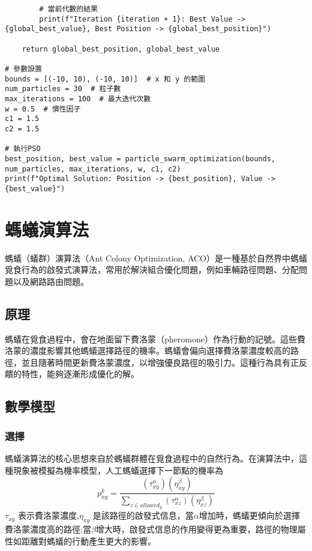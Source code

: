 \begin{verbatim}
        # 當前代數的結果
        print(f"Iteration {iteration + 1}: Best Value -> {global_best_value}, Best Position -> {global_best_position}")

    return global_best_position, global_best_value

# 參數設置
bounds = [(-10, 10), (-10, 10)]  # x 和 y 的範圍
num_particles = 30  # 粒子數
max_iterations = 100  # 最大迭代次數
w = 0.5  # 慣性因子
c1 = 1.5  
c2 = 1.5  

# 執行PSO
best_position, best_value = particle_swarm_optimization(bounds, num_particles, max_iterations, w, c1, c2)
print(f"Optimal Solution: Position -> {best_position}, Value -> {best_value}")
\end{verbatim}

\section{螞蟻演算法}
螞蟻（蟻群）演算法（Ant Colony Optimization, ACO）是一種基於自然界中螞蟻覓食行為的啟發式演算法，常用於解決組合優化問題，例如車輛路徑問題、分配問題以及網路路由問題。

\subsection{原理}
螞蟻在覓食過程中，會在地面留下費洛蒙（pheromone）作為行動的記號。這些費洛蒙的濃度影響其他螞蟻選擇路徑的機率。螞蟻會偏向選擇費洛蒙濃度較高的路徑，並且隨著時間更新費洛蒙濃度，以增強優良路徑的吸引力。這種行為具有正反饋的特性，能夠逐漸形成優化的解。
\subsection{數學模型}
\subsubsection{選擇}
螞蟻演算法的核心思想來自於螞蟻群體在覓食過程中的自然行為。在演算法中，這種現象被模擬為機率模型，人工螞蟻選擇下一節點的機率為
\begin{equation} \label{eq:ACO_probability}
    p^{k}_{xy} = \frac{(\tau^{\alpha}_{xy}) (\eta^{\beta}_{xy})}{\sum_{z \in allowed_{y}} (\tau^{\alpha}_{xz}) (\eta^{\beta}_{xz})}
\end{equation}
$\tau_{xy}$ 表示費洛蒙濃度,$\eta_{xy}$ 是該路徑的啟發式信息，當$\alpha$增加時，螞蟻更傾向於選擇費洛蒙濃度高的路徑;當$\beta$增大時，啟發式信息的作用變得更為重要，路徑的物理屬性如距離對螞蟻的行動產生更大的影響。
